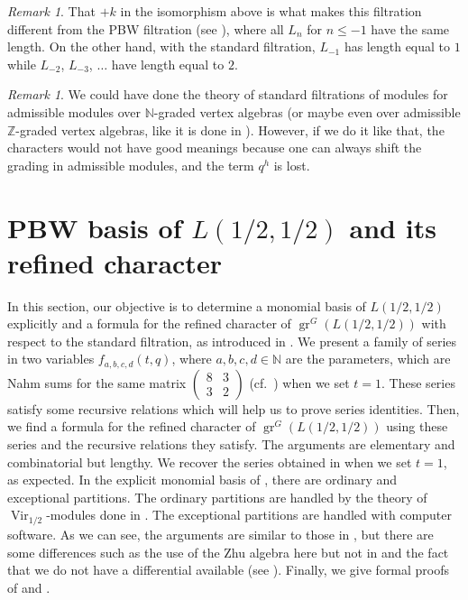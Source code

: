 \documentclass[a4paper, 12pt, reqno]{amsart}
\theoremstyle{remark}
\newtheorem{remark}[theorem]{Remark}
\numberwithin{equation}{subsection}
\DeclareMathOperator{\Vir}{Vir}
\DeclareMathOperator{\gr}{gr}
\begin{document}
\begin{remark}
  \label{rmk:41}
  That $+k$ in the isomorphism above is what makes this filtration different from the PBW filtration (see ), where all $L_n$ for $n \le -1$ have the same length.
  On the other hand, with the standard filtration, $L_{-1}$ has length equal to $1$ while $L_{-2}$, $L_{-3}$, $\dots$ have length equal to $2$.
\end{remark}

\begin{remark}
  \label{rmk:42}
  We could have done the theory of standard filtrations of modules for admissible modules over $\mathbb{N}$-graded vertex algebras (or maybe even over admissible $\mathbb{Z}$-graded vertex algebras, like it is done in \cite{li_vertex_2004}).
  However, if we do it like that, the characters would not have good meanings because one can always shift the grading in admissible modules, and the term $q^h$ is lost.
\end{remark}

\section{PBW basis of $L(1/2, 1/2)$ and its refined character}
\label{sec:pbw-basis-l12}

In this section, our objective is to determine a monomial basis of $L(1/2, 1/2)$ explicitly and a formula for the refined character of $\gr^G(L(1/2, 1/2))$ with respect to the standard filtration, as introduced in .
We present a family of series in two variables $f_{a, b, c, d}(t, q)$, where $a, b, c, d \in \mathbb{N}$ are the parameters, which are Nahm sums for the same matrix $\left(\begin{smallmatrix} 8 & 3 \\ 3 & 2 \end{smallmatrix}\right)$ (cf.\ \cite{Nahm2007}) when we set $t = 1$.
These series satisfy some recursive relations which will help us to prove series identities.
Then, we find a formula for the refined character of $\gr^G(L(1/2, 1/2))$ using these series and the recursive relations they satisfy.
The arguments are elementary and combinatorial but lengthy.
We recover the series obtained in \cite[Theorem 4]{andrews_singular_2022} when we set $t = 1$, as expected.
In the explicit monomial basis of , there are ordinary and exceptional partitions.
The ordinary partitions are handled by the theory of $\Vir_{1/2}$-modules done in .
The exceptional partitions are handled with computer software.
As we can see, the arguments are similar to those in \cite{andrews_singular_2022}, but there are some differences such as the use of the Zhu algebra here but not in \cite{andrews_singular_2022} and the fact that we do not have a differential available (see ).
Finally, we give formal proofs of  and .
\end{document}
